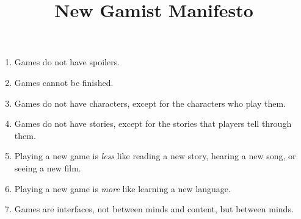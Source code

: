 \documentclass[12pt]{article}
\begin{document}
\title{New Gamist Manifesto}


\maketitle

\vspace{0.25in}

\thispagestyle{empty}

{\large

\begin{enumerate}
\setlength{\itemsep}{0.5in}

\item Games do not have spoilers.

\item Games cannot be finished.

\item Games do not have characters, except for the characters who play them.

\item Games do not have stories, except for the stories that players tell through them.

\item Playing a new game is {\it less} like reading a new story, hearing a new song, or seeing a new film.

\item Playing a new game is {\it more} like learning a new language.

\item Games are interfaces, not between minds and content, but between minds.
\end{enumerate}
}
\end{document}
